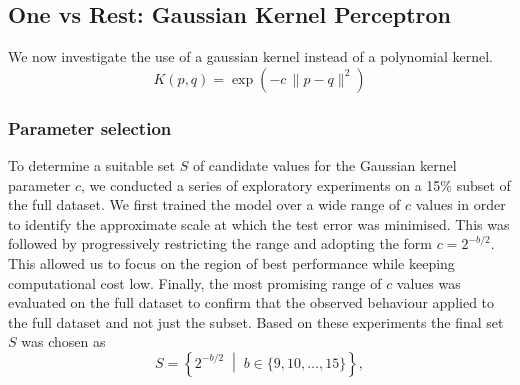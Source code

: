 \subsection{One vs Rest: Gaussian Kernel Perceptron}
We now investigate the use of a gaussian kernel instead of a polynomial kernel.
\begin{equation}
K(p,q) = \exp\!\left(-c\,\lVert p - q \rVert^2\right)
\end{equation}

\subsubsection{Parameter selection}
To determine a suitable set $S$ of candidate values for the Gaussian kernel parameter $c$, we conducted a series of exploratory experiments on a 15\% subset of the full dataset. We first trained the model over a wide range of $c$ values in order to identify the approximate scale at which the test error was minimised. This was followed by progressively restricting the range and adopting the form $c = 2^{-b/2}$. This allowed us to focus on the region of best performance while keeping computational cost low. Finally, the most promising range of $c$ values was evaluated on the full dataset to confirm that the observed behaviour applied to the full dataset and not just the subset. Based on these experiments the final set $S$ was chosen as
\[
S = \left\{ 2^{-b/2} \;\middle|\; b \in \{9,10,\dots,15\} \right\},
\]

